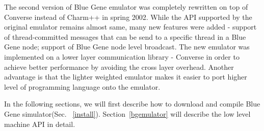\documentclass[10pt]{article}
\begin{document}
The second version of Blue Gene emulator was completely rewritten on top 
of Converse instead of Charm++ in spring 2002. 
While the API supported by the original emulator remains almost same,
many new features were added - support of thread-committed messages that 
can be send to a specific thread in a Blue Gene node; support of Blue Gene 
node level broadcast.
The new emulator was implemented on a lower layer communication 
library - Converse in order to achieve better 
performance by avoiding the cross layer overhead. 
Another advantage is that the lighter weighted emulator makes it easier
to port higher level of programming language onto the emulator.

In the following sections, we will first describe how to download and compile
Blue Gene simulator(Sec. ~\ref{install}). Section~\ref{bgemulator} will describe
the low level machine API in detail. 






\end{document}
